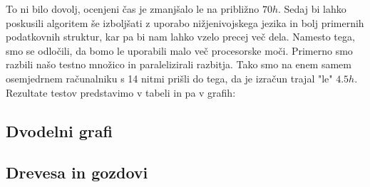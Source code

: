 \documentclass[12pt,a4paper]{amsart}
\theoremstyle{definition} %
\theoremstyle{plain} %
\begin{document}
To ni bilo dovolj, ocenjeni čas je zmanjšalo le na približno $70h$. Sedaj bi lahko poskusili algoritem še izboljšati z uporabo nižjenivojskega jezika in bolj
primernih podatkovnih struktur, kar pa bi nam lahko vzelo precej več dela. Namesto tega, smo se odločili, da bomo le uporabili malo več procesorske moči. Primerno
smo razbili našo testno množico in paralelizirali razbitja. Tako smo na enem samem osemjedrnem računalniku s 14 nitmi prišli do tega, da je izračun trajal "le" $4.5h$.
\\

Rezultate testov predstavimo v tabeli in pa v grafih:



\subsection{Dvodelni grafi}
\subsection{Drevesa in gozdovi}
\end{document}

